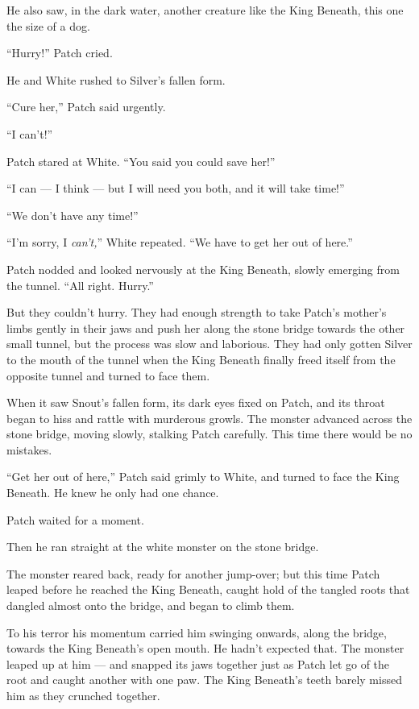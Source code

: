 \documentclass[ebook,oneside,openany,17pt]{memoir}
\newenvironment{tolerant}[1]{%
  \par\tolerance=#1\relax
}{%
  \par
}
\begin{document}
He also saw, in the dark water, another creature like the King
Beneath, this one the size of a dog.

“Hurry!” Patch cried.

He and White rushed to Silver’s fallen form.

“Cure her,” Patch said urgently.

“I can’t!”

Patch stared at White. “You said you could save her!”

“I can — I think — but I will need you both, and it will take time!”

“We don’t have any time!”

“I’m sorry, I \emph{can’t,}” White repeated. “We have to get her out
of here.”

Patch nodded and looked nervously at the King Beneath, slowly emerging
from the tunnel. “All right. Hurry.”

\begin{tolerant}{5000}
But they couldn’t hurry. They had enough strength to take Patch’s
mother’s limbs gently in their jaws and push her along the stone
bridge towards the other small tunnel, but the process was slow and
laborious. They had only gotten Silver to the mouth of the tunnel when
the King Beneath finally freed itself from the opposite tunnel and
turned to face them.
\end{tolerant}

\begin{tolerant}{2000}
When it saw Snout’s fallen form, its dark eyes fixed on Patch, and its
throat began to hiss and rattle with murderous growls. The monster
advanced across the stone bridge, moving slowly, stalking Patch
carefully. This time there would be no mistakes.
\end{tolerant}

“Get her out of here,” Patch said grimly to White, and turned to face
the King Beneath. He knew he only had one chance.

Patch waited for a moment.

Then he ran straight at the white monster on the stone bridge.

The monster reared back, ready for another jump-over; but this time
Patch leaped before he reached the King Beneath, caught hold of the
tangled roots that dangled almost onto the bridge, and began to climb
them.

\begin{tolerant}{500}
To his terror his momentum carried him swinging onwards, along the
bridge, towards the King Beneath’s open mouth. He hadn’t expected
that. The monster leaped up at him — and snapped its jaws together
just as Patch let go of the root and caught another with one paw. The
King Beneath’s teeth bare\-ly missed him as they crunched together.
\end{tolerant}
\end{document}
